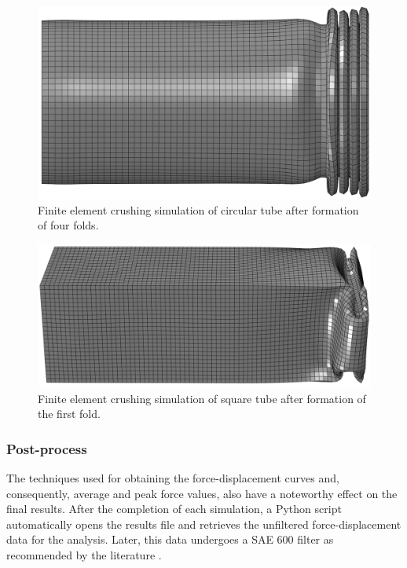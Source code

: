 \documentclass[12pt,number,preprint,review,times]{elsarticle}
\begin{document}
\begin{figure}[htpb]
  \centering
   \includegraphics[width=.8\columnwidth, angle=90]{./twt_circ.png}
  \caption{Finite element crushing simulation of circular tube after formation of four folds.}
  \label{fig:twt_circ}
\end{figure}

\begin{figure}[htpb]
  \centering
   \includegraphics[width=\columnwidth, angle=90.3]{./sq_1fold.png}
  \caption{Finite element crushing simulation of square tube after formation of the first fold.}
  \label{fig:twt_sq}
\end{figure}

\subsubsection{Post-process}

\label{sec:postprocess}
The techniques used for obtaining the force-displacement curves and, consequently, average and peak force values, also have a noteworthy effect on the final results. After the completion of each simulation, a Python script automatically opens the results file and retrieves the unfiltered force-displacement data for the analysis. Later, this data undergoes a SAE 600 filter \cite{J211} as recommended by the literature \citep{Huanglibro}.
\end{document}
